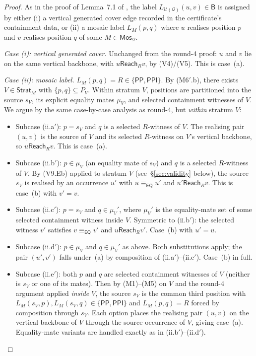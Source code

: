 \documentclass[11pt]{article}
\theoremstyle{definition}
\theoremstyle{remark}
\newcommand{\PP}{\mathsf{PP}}
\newcommand{\PPI}{\mathsf{PPI}}
\newcommand{\EQ}{\mathsf{EQ}}
\newcommand{\Base}{\mathsf{B}}
\newcommand{\Mos}{\mathsf{Mos}}
\newcommand{\Reach}{\mathsf{Reach}}
\newcommand{\Q}{\mathcal{Q}}
\newcommand{\U}{\mathcal{U}}
\newcommand{\Stratum}{\mathsf{Strat}}
\newcommand{\eqc}{\equiv_{\EQ}}
\begin{document}
\begin{proof}
As in the proof of Lemma~7.1 of \cite{GPT55Repaired}, the label
$L_{\U(\Q)}(u,v)\in\Base$ is assigned by either (i) a vertical
generated cover edge recorded in the certificate's containment data,
or (ii) a mosaic label $L_M(p,q)$ where $u$ realises position $p$ and
$v$ realises position $q$ of some $M\in\Mos_\Q$.

\emph{Case (i): vertical generated cover.}  Unchanged from the
round-4 proof: $u$ and $v$ lie on the same vertical backbone, with
$u\Reach_R v$, by (V4)/(V5).  This is case~(a).

\emph{Case (ii): mosaic label.}  $L_M(p,q)=R\in\{\PP,\PPI\}$.  By
(M6$'$.b), there exists $V\in\Stratum_M$ with $\{p,q\}\subseteq
P_V$.  Within stratum $V$, positions are partitioned into the
source $s_V$, its explicit equality mates $\mu_V$, and selected
containment witnesses of $V$.  We argue by the same case-by-case
analysis as round-4, but \emph{within} stratum $V$:

\begin{itemize}
\item Subcase (ii.a$'$): $p=s_V$ and $q$ is a selected $R$-witness of
  $V$.  The realising pair $(u,v)$ is the source of $V$ and its
  selected $R$-witness on $V$'s vertical backbone, so $u\Reach_R v$.
  This is case~(a).

\item Subcase (ii.b$'$): $p\in\mu_V$ (an equality mate of $s_V$) and
  $q$ is a selected $R$-witness of $V$.  By (V9.Eb) applied to
  stratum $V$ (see~\S\ref{sec:validity} below), the source $s_V$ is
  realised by an occurrence $u'$ with $u\eqc u'$ and $u'\Reach_R v$.
  This is case~(b) with $v'=v$.

\item Subcase (ii.c$'$): $p=s_V$ and $q\in\mu_V'$, where $\mu_V'$ is
  the equality-mate set of some selected containment witness inside
  $V$.  Symmetric to (ii.b$'$): the selected witness $v'$ satisfies
  $v\eqc v'$ and $u\Reach_R v'$.  Case~(b) with $u'=u$.

\item Subcase (ii.d$'$): $p\in\mu_V$ and $q\in\mu_V'$ as above.  Both
  substitutions apply; the pair $(u',v')$ falls under~(a) by
  composition of (ii.a$'$)--(ii.c$'$).  Case~(b) in full.

\item Subcase (ii.e$'$): both $p$ and $q$ are selected containment
  witnesses of $V$ (neither is $s_V$ or one of its mates).  Then by
  (M1)--(M5) on $V$ and the round-4 argument applied \emph{inside
  $V$}, the source $s_V$ is the common third position with
  $L_M(s_V,p),L_M(s_V,q)\in\{\PP,\PPI\}$ and $L_M(p,q)=R$ forced by
  composition through $s_V$.  Each option places the realising pair
  $(u,v)$ on the vertical backbone of $V$ through the source
  occurrence of $V$, giving case~(a).  Equality-mate variants are
  handled exactly as in (ii.b$'$)--(ii.d$'$).
\end{itemize}


\end{proof}
\end{document}
